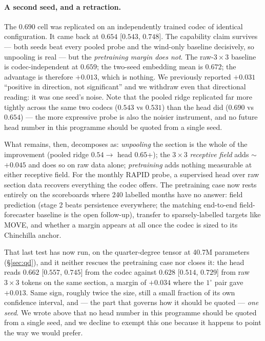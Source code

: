 \documentclass[10pt]{article}
\begin{document}
\paragraph{A second seed, and a retraction.} The $0.690$ cell was
replicated on an independently trained codec of identical
configuration. It came back at $0.654$ [$0.543$, $0.748$]. The
capability claim survives --- both seeds beat every pooled probe and the
wind-only baseline decisively, so unpooling is real --- but the
\emph{pretraining margin does not}. The raw-$3\times3$ baseline is
codec-independent at $0.659$; the two-seed embedding mean is $0.672$;
the advantage is therefore $+0.013$, which is nothing. We previously
reported $+0.031$ ``positive in direction, not significant'' and we
withdraw even that directional reading: it was one seed's noise. Note
that the pooled ridge replicated far more tightly across the same two
codecs ($0.543$ vs $0.531$) than the head did ($0.690$ vs $0.654$) ---
the more expressive probe is also the noisier instrument, and no future
head number in this programme should be quoted from a single seed.

What remains, then, decomposes as: \emph{unpooling} the section is the
whole of the improvement (pooled ridge $0.54\to$ head $0.65$+); the
$3\times3$ \emph{receptive field} adds $\sim$$+0.045$ and does so on raw
data alone; \emph{pretraining} adds nothing measurable at either
receptive field. For the monthly RAPID probe, a supervised head over raw
section data recovers everything the codec offers. The pretraining case
now rests entirely on the scoreboards where 240 labelled months have no
answer: field prediction (stage 2 beats persistence everywhere; the
matching end-to-end field-forecaster baseline is the open follow-up),
transfer to sparsely-labelled targets like MOVE, and whether a margin
appears at all once the codec is sized to its Chinchilla anchor.

That last test has now run, on the quarter-degree tensor at 40.7M
parameters (\S\ref{sec:qd}), and it neither rescues the pretraining
case nor closes it: the head reads $0.662$ [$0.557$, $0.745$] from the
codec against $0.628$ [$0.514$, $0.729$] from raw $3\times3$ tokens on
the same section, a margin of $+0.034$ where the $1^\circ$ pair gave
$+0.013$. Same sign, roughly twice the size, still a small fraction of
its own confidence interval, and --- the part that governs how it
should be quoted --- \emph{one seed}. We wrote above that no head number
in this programme should be quoted from a single seed, and we decline to
exempt this one because it happens to point the way we would prefer.
\end{document}

